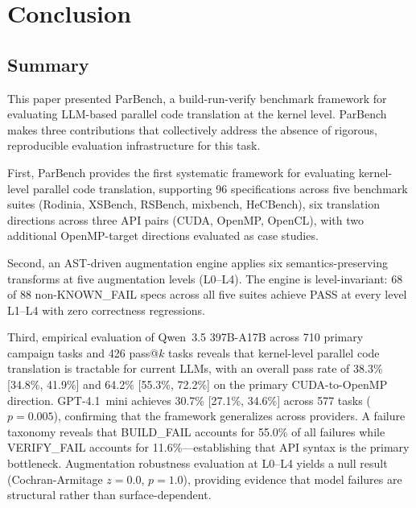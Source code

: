 \documentclass{article}
\newcommand{\buildfail}{\textsc{BUILD\_FAIL}}
\newcommand{\verifyfail}{\textsc{VERIFY\_FAIL}}
\begin{document}
\section{Conclusion}
\label{sec:conclusion}

\subsection{Summary}

This paper presented ParBench, a build-run-verify benchmark framework for evaluating LLM-based parallel code translation at the kernel level. ParBench makes three contributions that collectively address the absence of rigorous, reproducible evaluation infrastructure for this task.

First, ParBench provides the first systematic framework for evaluating kernel-level parallel code translation, supporting 96 specifications across five benchmark suites (Rodinia, XSBench, RSBench, mixbench, HeCBench), six translation directions across three API pairs (CUDA, OpenMP, OpenCL), with two additional OpenMP-target directions evaluated as case studies.

Second, an AST-driven augmentation engine applies six semantics-preserving transforms at five augmentation levels (L0--L4). The engine is level-invariant: 68 of 88 non-KNOWN\_FAIL specs across all five suites achieve PASS at every level L1--L4 with zero correctness regressions.

Third, empirical evaluation of Qwen~3.5 397B-A17B across 710 primary campaign tasks and 426 pass@$k$ tasks reveals that kernel-level parallel code translation is tractable for current LLMs, with an overall pass rate of 38.3\% [34.8\%, 41.9\%] and 64.2\% [55.3\%, 72.2\%] on the primary CUDA-to-OpenMP direction. GPT-4.1~mini achieves 30.7\% [27.1\%, 34.6\%] across 577 tasks ($p = 0.005$), confirming that the framework generalizes across providers. %
A failure taxonomy reveals that \buildfail{} accounts for 55.0\% of all failures while \verifyfail{}{} accounts for 11.6\%---establishing that API syntax is the primary bottleneck. Augmentation robustness evaluation at L0--L4 yields a null result (Cochran-Armitage $z = 0.0$, $p = 1.0$), providing evidence that model failures are structural rather than surface-dependent.
\end{document}
